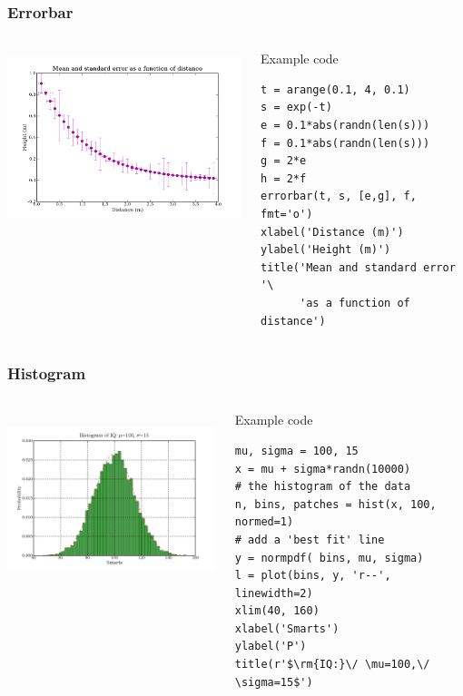 \documentclass[14pt,compress]{beamer}
\begin{document}
\begin{frame}[fragile] \frametitle{Errorbar}
  \begin{columns}
    \hspace*{-0.5in}
  \includegraphics[height=2in, interpolate=true]{data/errorbar}  
    \begin{block}{Example code}
    \tiny
\begin{lstlisting}
t = arange(0.1, 4, 0.1)
s = exp(-t)
e = 0.1*abs(randn(len(s)))
f = 0.1*abs(randn(len(s)))
g = 2*e
h = 2*f
errorbar(t, s, [e,g], f, fmt='o')
xlabel('Distance (m)')
ylabel('Height (m)')
title('Mean and standard error '\
      'as a function of distance')
\end{lstlisting}
  \end{block}
\end{columns}
\end{frame}

\begin{frame}[fragile] \frametitle{Histogram}
  \begin{columns}
    \hspace*{-0.5in}
  \includegraphics[height=2in, interpolate=true]{data/histogram}  
    \column{0.45\textwidth}
    \begin{block}{Example code}
    \tiny
\begin{lstlisting}
mu, sigma = 100, 15
x = mu + sigma*randn(10000)
# the histogram of the data
n, bins, patches = hist(x, 100, normed=1)
# add a 'best fit' line
y = normpdf( bins, mu, sigma)
l = plot(bins, y, 'r--', linewidth=2)
xlim(40, 160)
xlabel('Smarts')
ylabel('P')
title(r'$\rm{IQ:}\/ \mu=100,\/ \sigma=15$')
\end{lstlisting}
  \end{block}
\end{columns}
\end{frame}
\end{document}
